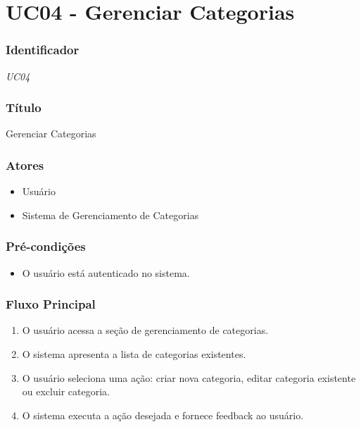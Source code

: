 \chapter{UC04 - Gerenciar Categorias}
\label{apendiceUC04}

\subsection*{Identificador}
\textit{UC04}

\subsection*{Título}
Gerenciar Categorias

\subsection*{Atores}
\begin{addmargin}[1.5cm]{0cm}
    \begin{itemize}
        \item Usuário
        \item Sistema de Gerenciamento de Categorias
    \end{itemize}
\end{addmargin}

\subsection*{Pré-condições}
\begin{addmargin}[1.5cm]{0cm}
    \begin{itemize}
        \item O usuário está autenticado no sistema.
    \end{itemize}
\end{addmargin}

\subsection*{Fluxo Principal}
\begin{addmargin}[1.5cm]{0cm}
    \begin{enumerate}
        \item O usuário acessa a seção de gerenciamento de categorias.
        \item O sistema apresenta a lista de categorias existentes.
        \item O usuário seleciona uma ação: criar nova categoria, editar categoria existente ou excluir categoria.
        \item O sistema executa a ação desejada e fornece feedback ao usuário.
    \end{enumerate}
\end{addmargin}

